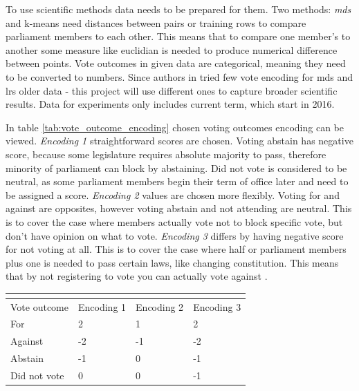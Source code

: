 \documentclass[a4paper,12pt]{article}
\begin{document}
   	To use scientific methods data needs to be prepared for them. Two methods: \textit{\acrshort{mds}} and \gls{k-means} need distances between pairs or training rows to compare parliament members to each other. This means that to compare one member's to another some measure like \gls{euclidian} is needed to produce numerical difference between points. Vote outcomes in given data are categorical, meaning they need to be converted to numbers. Since authors in  \cite{vytautas_mick_magistrinis} tried few vote encoding for \acrshort{mds} and \gls{lrs} older data - this project will use different ones to capture broader scientific results. Data for experiments only includes current term, which start in 2016.
   	
   	In table \ref{tab:vote_outcome_encoding} chosen voting outcomes encoding can be viewed. \textit{Encoding 1} straightforward scores are chosen. Voting abstain has negative score, because some legislature requires absolute majority to pass, therefore minority of parliament can block by abstaining. Did not vote is considered to be neutral, as some parliament members begin their term of office later and need to be assigned a score. \textit{Encoding 2} values are chosen more flexibly. Voting for and against are opposites, however voting abstain and not attending are neutral. This is to cover the case where members actually vote not to block specific vote, but don't have opinion on what to vote. \textit{Encoding 3} differs by having negative score for not voting at all. This is to cover the case where half or parliament members plus one is needed to pass certain laws, like changing constitution. This means that by not registering to vote you can actually vote against \cite{konstitucija}.
 
 	\noindent
   	\begin{center}
   		\begin{tabular}{L{3cm} C{2cm} C{2cm} C{2cm}}
   			\\ 
   			\hline
   			Vote outcome & Encoding 1 & Encoding 2& Encoding 3  \\\hline
   			For & 2 & 1 & 2 \\
 			Against & -2 & -1 & -2\\
 			Abstain & -1 & 0 & -1\\
 			Did not vote & 0 & 0 & -1\\
   			\hline
   		\end{tabular}
   		 \label{tab:vote_outcome_encoding}
   	\end{center}
   
\end{document}
